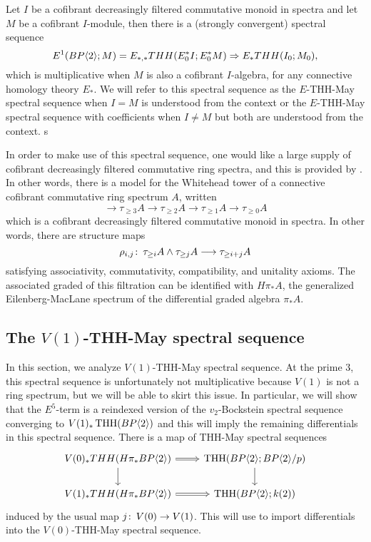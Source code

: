 \begin{thm}
Let $I$ be a cofibrant decreasingly filtered commutative monoid in spectra and let $M$ be a cofibrant $I$-module, then there is a (strongly convergent) spectral sequence 
\begin{equation}\label{THH-May-BM} E^1(BP\langle 2 \rangle;M) =E_{*,*}THH(E_0^*I;E_0^*M)\Rightarrow E_*THH(I_0;M_0),\end{equation}
which is multiplicative when $M$ is also a cofibrant $I$-algebra, for any connective homology theory $E_*$. We will refer to this spectral sequence as the $E$-THH-May spectral sequence when $I=M$ is understood from the context or the $E$-THH-May spectral sequence with coefficients when $I\ne M$ but both are understood from the context. s
\end{thm}

In order to make use of this spectral sequence, one would like a large supply of cofibrant decreasingly filtered commutative ring spectra, and this is provided by \cite[Thm. 4.2.1]{THH-May}. In other words, there is a model for the Whitehead tower of a connective cofibrant commutative ring spectrum $A$, written 
\[ \rightarrow  \tau_{\ge 3}A \rightarrow \tau_{\ge 2}A \rightarrow \tau_{\ge 1}A \rightarrow \tau_{\ge 0} A \]
which is a cofibrant decreasingly filtered commutative monoid in spectra. In other words, there are structure maps 
\[ \rho_{i,j}\colon \thinspace \tau_{\ge i}A \wedge \tau_{\ge j} A \longrightarrow \tau_{\ge i+j}A \]
satisfying associativity, commutativity, compatibility, and unitality axioms. 
The associated graded of this filtration can be identified with $H\pi_*A$, the generalized Eilenberg-MacLane spectrum of the differential graded algebra $\pi_*A$. 


\subsection{The $V(1)$-THH-May spectral sequence}
In this section, we analyze $V(1)$-THH-May spectral sequence. At the prime $3$, this spectral sequence is unfortunately not multiplicative because $V(1)$ is not a ring spectrum, but we will be able to skirt this issue. In particular, we will show that the $E^5$-term is a reindexed version of the $v_2$-Bockstein spectral sequence converging to $V(1)_*\operatorname{THH}(BP\langle 2 \rangle)$ and this will imply the remaining differentials in this spectral sequence. 
There is a map of THH-May spectral sequences 
\[
\begin{tikzcd}
	V(0)_*THH(H\pi_*\B)\arrow[r, Rightarrow]\arrow[d]& \THH(\B;\B/p)\arrow[d]\\
	V(1)_*THH(H\pi_*\B)\arrow[r, Rightarrow] & \THH(\B;k(2))
\end{tikzcd}
\]
induced by the usual map $j\colon \thinspace V(0)\to V(1)$. This will use to import differentials into the $V(0)$-THH-May spectral sequence. 

